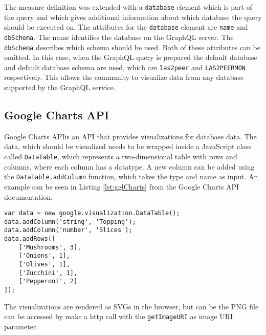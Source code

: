 The measure definition was extended with a \texttt{database} element which is part of the query and which gives additional information about which database the query should be executed on. The attributes for the \texttt{database} element are \texttt{name} and \texttt{dbSchema}. The name identifies the database on the GraphQL server. The \texttt{dbSchema} describes which schema should be used.
Both of these attributes can be omitted. In this case, when the GraphQL query is prepared the default database and default database schema are used, which are \texttt{las2peer} and \texttt{LAS2PEERMON} respectively.
This allows the community to visualize data from any database supported by the GraphQL service.

\subsection{Google Charts API}
Google Charts API\footnotemark is an API that provides visualizations for database data. The data, which should be visualized needs to be wrapped inside a JavaScript class called \texttt{DataTable}, which represents a two-dimensional table with rows and columns, where each column has a datatype.
A new column can be added using the \texttt{DataTable.addColumn} function, which takes the type and name as input. An example can be seen in Listing \ref{lst:gglCharts} from the Google Charts API documentation\footnotemark[\value{footnote}].

\begin{lstlisting}[caption=Example use of the DataTable class,captionpos=b,label={lst:gglCharts}]
var data = new google.visualization.DataTable();
data.addColumn('string', 'Topping');
data.addColumn('number', 'Slices');
data.addRows([
	['Mushrooms', 3],
	['Onions', 1],
	['Olives', 1], 
	['Zucchini', 1],
	['Pepperoni', 2]
]);
\end{lstlisting}

The visualizations are rendered as SVGs in the browser, but can be the PNG file can be accessed by make a http call with the \texttt{getImageURI} as image URI parameter. 

